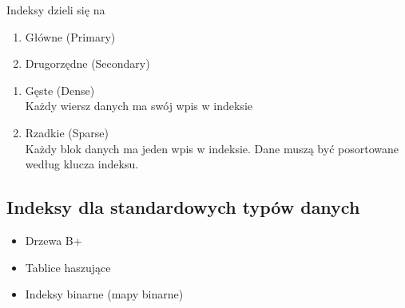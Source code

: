 \documentclass[12pt]{article}
\begin{document}
    Indeksy dzieli się na
    \begin{enumerate}
        \item Główne (Primary)
        \item Drugorzędne (Secondary)
    \end{enumerate}
    
    \begin{enumerate}
        \item Gęste (Dense)\\
        Każdy wiersz danych ma swój wpis w indeksie
        \item Rzadkie (Sparse)\\
        Każdy blok danych ma jeden wpis w indeksie. Dane muszą być posortowane według klucza indeksu.
    \end{enumerate}
    
    \subsection{Indeksy dla standardowych typów danych}
    \begin{itemize}
        \item Drzewa B+
        \item Tablice haszujące
        \item Indeksy binarne (mapy binarne)
    \end{itemize}
    
\end{document}
